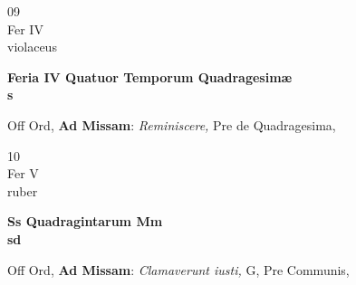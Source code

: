\documentclass[10pt, openany]{book}
\begin{document}
        \begin{center}
            \begin{minipage}{3.5in}
                \vspace{2em}
                \begin{minipage}{0.5in}
                    {\Huge 09} \\
                    {\normalsize Fer IV} \\
                    {\normalsize violaceus}
                \end{minipage}
                \begin{minipage}{3.0in}
                    \textbf{ \large Feria IV Quatuor Temporum Quadragesimæ \\
                    \textnormal{\normalsize s}} \\ 
                \end{minipage}
                \begin{justify}Off Ord, \textbf{Ad Missam}: \textit{Reminiscere,} Pre de Quadragesima,  
                \end{justify}
            \end{minipage}
        \end{center}
    
        \begin{center}
            \begin{minipage}{3.5in}
                \vspace{2em}
                \begin{minipage}{0.5in}
                    {\Huge 10} \\
                    {\normalsize Fer V} \\
                    {\normalsize ruber}
                \end{minipage}
                \begin{minipage}{3.0in}
                    \textbf{ \large Ss Quadragintarum Mm \\
                    \textnormal{\normalsize sd}} \\ 
                \end{minipage}
                \begin{justify}Off Ord, \textbf{Ad Missam}: \textit{Clamaverunt iusti,} G, Pre Communis,  
                \end{justify}
            \end{minipage}
        \end{center}
    
\end{document}
